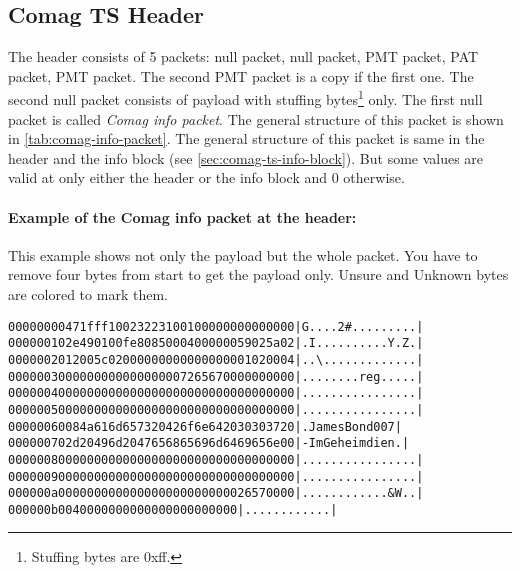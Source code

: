 \documentclass{scrartcl}
\begin{document}
\subsection{Comag TS Header}
\label{sec:comag-ts-header}

The header consists of 5 packets: null packet, null packet, PMT packet, PAT
packet, PMT packet. The second PMT packet is a copy if the first one. The
second null packet consists of payload with stuffing bytes\footnote{Stuffing
  bytes are 0xff.} only. The first null packet is called \emph{Comag info
  packet}. The general structure of this packet is shown in
\autoref{tab:comag-info-packet}. The general structure of this packet is same
in the header and the info block (see \autoref{sec:comag-ts-info-block}). But
some values are valid at only either the header or the info block and 0
otherwise.

\paragraph{Example of the Comag info packet at the header:} This example shows
not only the payload but the whole packet. You have to remove four bytes from
start to get the payload only. \textcolor{unsure}{Unsure} and
\textcolor{unknown}{Unknown} bytes are colored to mark them.

{\small
\begin{alltt}
00000000  47 1f ff 10 \textcolor{unsure}{02 32 23 10  01} 00 00 00 00 00 00 00  |G....2\#.........|
00000010  2e 49 01 00 fe 80 85 00  04 00 00 00 59 02 5a 02  |.I..........Y.Z.|
00000020  12 00 5c 02 00 00 00 00  00 00 00 00 01 02 00 04  |..\textbackslash.............|
00000030  00 00 00 00 00 00 00 00  \textcolor{unsure}{72 65 67 00 00 00 00 00}  |........reg.....|
00000040  00 00 00 00 00 00 00 00  00 00 00 00 00 00 00 00  |................|
00000050  00 00 00 00 00 00 00 00  00 00 00 00 00 00 00 00  |................|
00000060  08 4a 61 6d 65 73 20 42  6f 6e 64 20 30 30 37 20  |.James Bond 007 |
00000070  2d 20 49 6d 20 47 65 68  65 69 6d 64 69 65 6e 00  |- Im Geheimdien.|
00000080  00 00 00 00 00 00 00 00  00 00 00 00 00 00 00 00  |................|
00000090  00 00 00 00 00 00 00 00  00 00 00 00 00 00 00 00  |................|
000000a0  00 00 00 00 00 00 00 00  00 00 00 00 \textcolor{unknown}{26 57 00 00}  |............\&W..|
000000b0  04 00 00 00 00 00 00 00  00 00 00 00              |............|
\end{alltt}
}
\end{document}
